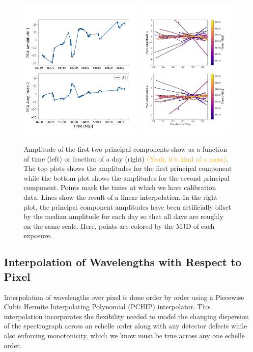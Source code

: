 \documentclass[modern]{aastex63}
\newcommand{\lz}[1]{\textcolor{orange}{#1}}
\begin{document}
\begin{figure}[h!]
\centering
\includegraphics[width=0.56\textwidth]{Figures/pcA_lfc.png}
\includegraphics[width=0.42\textwidth]{Figures/pcAs_byDay.png}
\caption{Amplitude of the first two principal components show as a function of time (left) or fraction of a day (right) \lz{(Yeah, it's kind of a mess)}.  The top plots shows the amplitudes for the first principal component while the bottom plot shows the amplitudes for the second principal component.  Points mark the times at which we have calibration data.  Lines show the result of a linear interpolation.  In the right plot, the principal component amplitudes have been artificially offset by the median amplitude for each day so that all days are roughly on the same scale.  Here, points are colored by the MJD of each exposure.}
\label{fig:nightlyVariation}
\end{figure} 


\subsection{Interpolation of Wavelengths with Respect to Pixel}
\label{sec:choice_wvp}
Interpolation of wavelengths over pixel  is done order by order using a Piecewise Cubic Hermite Interpolating Polynomial (PCHIP) interpolator.  This interpolation incorporates the flexibility needed to model the changing dispersion of the spectrograph across an echelle order along with any detector defects while also enforcing monotonicity, which we know must be true across any one echelle order.
\end{document}
